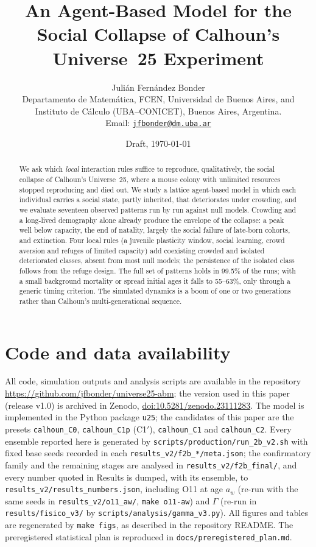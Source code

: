 \documentclass[11pt]{article}
\title{An Agent-Based Model for the Social Collapse of Calhoun's Universe~25 Experiment}
\author{Julián Fernández Bonder\\[2pt]
{\small Departamento de Matemática, FCEN, Universidad de Buenos Aires, and}\\
{\small Instituto de Cálculo (UBA--CONICET), Buenos Aires, Argentina.}\\
{\small Email: \href{mailto:jfbonder@dm.uba.ar}{\texttt{jfbonder@dm.uba.ar}}}}
\date{Draft, \today}
\newcommand{\zenododoi}[1]{\href{https://doi.org/#1}{doi:#1}}
\newcommand{\repourl}{\url{https://github.com/jfbonder/universe25-abm}}
\begin{document}
\maketitle

\begin{abstract}
We ask which \emph{local} interaction rules suffice to reproduce, qualitatively, the social collapse of Calhoun's
Universe~25, where a mouse colony with unlimited resources stopped reproducing and died out.
We study a lattice agent-based model in which each individual carries a social state, partly inherited, that
deteriorates under crowding, and we evaluate seventeen observed patterns run by run against null models.
Crowding and a long-lived demography alone already produce the envelope of the collapse: a peak well below
capacity, the end of natality, largely the social failure of late-born cohorts, and extinction.
Four local rules (a juvenile plasticity window, social learning, crowd aversion and refuges of limited capacity) add
coexisting crowded and isolated deteriorated classes, absent from most null models; the persistence of the isolated
class follows from the refuge design.
The full set of patterns holds in 99.5\% of the runs; with a small background mortality or spread initial ages it
falls to 55--63\%, only through a generic timing criterion.
The simulated dynamics is a boom of one or two generations rather than Calhoun's multi-generational sequence.
\end{abstract}










\section*{Code and data availability}
All code, simulation outputs and analysis scripts are available in the repository \repourl; the version used in this paper (release v1.0) is archived in Zenodo, \zenododoi{10.5281/zenodo.23111283}. The model is implemented in the Python package
\texttt{u25}; the candidates of this paper are the presets \texttt{calhoun\_C0}, \texttt{calhoun\_C1p} (\textsf{C1}$'$),
\texttt{calhoun\_C1} and \texttt{calhoun\_C2}. Every ensemble reported here is generated by
\texttt{scripts/production/run\_2b\_v2.sh} with fixed base seeds recorded in each \texttt{results\_v2/f2b\_*/meta.json};
the confirmatory family and the remaining stages are analysed in \texttt{results\_v2/f2b\_final/}, and every number
quoted in Results is dumped, with its ensemble, to \texttt{results\_v2/results\_numbers.json}, including O11 at
age $a_w$ (re-run with the same seeds in \texttt{results\_v2/o11\_aw/}, \texttt{make o11-aw}) and $\Gamma$ (re-run in
\texttt{results/fisico\_v3/} by \texttt{scripts/analysis/gamma\_v3.py}). All figures and
tables are regenerated by \texttt{make figs}, as described in the repository README. The preregistered statistical
plan is reproduced in \texttt{docs/preregistered\_plan.md}.
\end{document}
